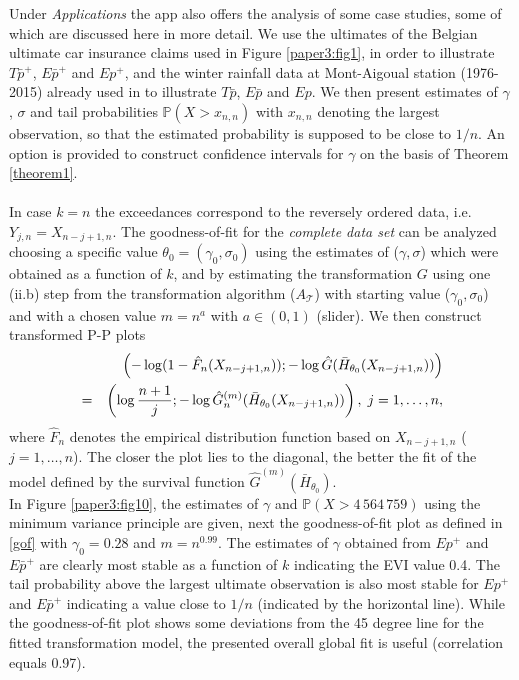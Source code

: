 \noindent
Under {\it Applications} the app also offers the analysis of some case studies, some of which are discussed here in more detail. We use the ultimates of the Belgian ultimate car insurance claims used in Figure \ref{paper3:fig1}, in order to illustrate  $T\bar{p}^+$, $E\bar{p}^+$ and $Ep^+$, and the winter rainfall data at Mont-Aigoual station (1976-2015)  already used in \cite{tencaliec2018flexible} to illustrate $T\bar{p}$, $E\bar{p}$ and $Ep$. We then present estimates of $\gamma$, $\sigma$ and tail probabilities $\mathbb{P}(X>x_{n,n})$ with $x_{n,n}$ denoting the largest observation, so that the estimated probability is supposed to be close to $1/n$. An option is provided to construct confidence intervals for $\gamma$ on the basis of Theorem \ref{theorem1}. \\\\
In case $k=n$ the exceedances correspond to the reversely ordered data, i.e. $Y_{j,n}= X_{n-j+1,n}$. The goodness-of-fit for the {\it complete data set} can be analyzed choosing a specific value $\theta_0=(\gamma_0,\sigma_0)$ using the estimates of ($\gamma,\sigma$) which were obtained as a function of $k$, and by estimating the transformation $G$ using one (ii.b) step from the transformation algorithm ($A_{\mathcal T}$) with starting value ($\gamma_0,\sigma_0$) and with a chosen value $m=n^a$ with $a \in (0,1)$ (slider). We then construct transformed P-P plots
\begin{eqnarray}
 && \hspace{-1cm} \left( -\log (1-\hat{F}_n (X_{n-j+1,n})); -\log \hat{G}(\bar{H}_{\theta_0}(X_{n-j+1,n})) \right)
 \nonumber \\
 &=& 
\left( \log {n+1 \over j}; -\log \hat{G}_n^{(m)}(\bar{H}_{\theta_0}(X_{n-j+1,n})) \right), \; j=1,\ldots,n,
 \label{gof}
\end{eqnarray} 
 where $\hat{F}_n$ denotes the empirical distribution function based on $X_{n-j+1,n}$ ($j=1,\ldots,n$). The closer the plot lies to the diagonal, the better the fit of the model defined by the survival function $\hat{G}^{(m)} (\bar{H}_{\theta_0})$.\\
 
 \noindent
In Figure \ref{paper3:fig10}, the estimates of $\gamma$ and $\mathbb{P}(X>4 \, 564 \,759)$ using the minimum variance principle are given, next the goodness-of-fit plot as defined in \eqref{gof} with $\gamma_0=0.28$ and $m=n^{0.99}$. The estimates of $\gamma$ obtained from $Ep^+$ and $E\bar{p}^+$ are clearly most stable as a function of $k$ indicating the EVI value 0.4. The tail probability above the largest ultimate observation is also most stable for $Ep^+$ and $E\bar{p}^+$ indicating a value close to $1/n$ (indicated by the horizontal line). While the goodness-of-fit plot shows some deviations from the 45 degree line for the fitted transformation model, the presented overall global fit is useful (correlation equals 0.97). \\

